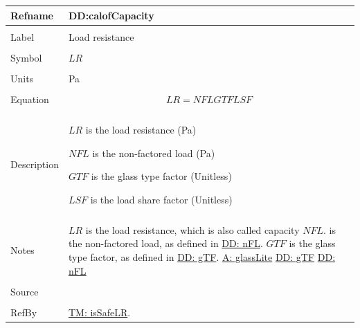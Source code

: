 \documentclass[12pt]{article}
\begin{document}
\noindent \begin{minipage}{\textwidth}
\begin{tabular}{p{} p{}}
\toprule \textbf{Refname} & \textbf{DD:calofCapacity}
\label{DD:calofCapacity}
\\ \midrule \\
Label & Load resistance
        \\ \midrule \\
        Symbol & $LR$
                 \\ \midrule \\
                 Units & Pa
                         \\ \midrule \\
                         Equation & \begin{displaymath}
                                    LR=NFL GTF LSF
                                    \end{displaymath}
                                    \\ \midrule \\
                                    Description & \begin{symbDescription}
                                                  \item{$LR$ is the load resistance (Pa)}
                                                  \item{$NFL$ is the non-factored load (Pa)}
                                                  \item{$GTF$ is the glass type factor (Unitless)}
                                                  \item{$LSF$ is the load share factor (Unitless)}
                                                  \end{symbDescription}
                                                  \\ \midrule \\
                                                  Notes & $LR$ is the load resistance, which is also called capacity $NFL$. is the non-factored load, as defined in \hyperref[DD:nFL]{DD: nFL}. $GTF$ is the glass type factor, as defined in \hyperref[DD:gTF]{DD: gTF}.
                                                          \hyperref[assumpGL]{A: glassLite}
                                                          \hyperref[DD:gTF]{DD: gTF}
                                                          \hyperref[DD:nFL]{DD: nFL}
                                                          \\ \midrule \\
                                                          Source & \cite{astm2009}
                                                                   \\ \midrule \\
                                                                   RefBy & \hyperref[TM:isSafeLR]{TM: isSafeLR}.
\\ \bottomrule \end{tabular}
\end{minipage}
\par~
\end{document}
